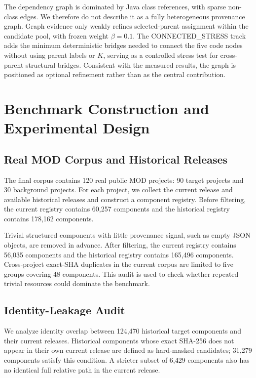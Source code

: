 \documentclass[runningheads]{llncs}
\begin{document}
The dependency graph is dominated by Java class references, with sparse non-class edges. We therefore do not describe it as a fully heterogeneous provenance graph. Graph evidence only weakly refines selected-parent assignment within the candidate pool, with frozen weight $\beta=0.1$. The CONNECTED\_STRESS track adds the minimum deterministic bridges needed to connect the five code nodes without using parent labels or $K$, serving as a controlled stress test for cross-parent structural bridges. Consistent with the measured results, the graph is positioned as optional refinement rather than as the central contribution.

\section{Benchmark Construction and Experimental Design}

\subsection{Real MOD Corpus and Historical Releases}

The final corpus contains 120 real public MOD projects: 90 target projects and 30 background projects. For each project, we collect the current release and available historical releases and construct a component registry. Before filtering, the current registry contains 60,257 components and the historical registry contains 178,162 components.

Trivial structured components with little provenance signal, such as empty JSON objects, are removed in advance. After filtering, the current registry contains 56,035 components and the historical registry contains 165,496 components. Cross-project exact-SHA duplicates in the current corpus are limited to five groups covering 48 components. This audit is used to check whether repeated trivial resources could dominate the benchmark.

\subsection{Identity-Leakage Audit}

We analyze identity overlap between 124,470 historical target components and their current releases. Historical components whose exact SHA-256 does not appear in their own current release are defined as hard-masked candidates; 31,279 components satisfy this condition. A stricter subset of 6,429 components also has no identical full relative path in the current release.
\end{document}
